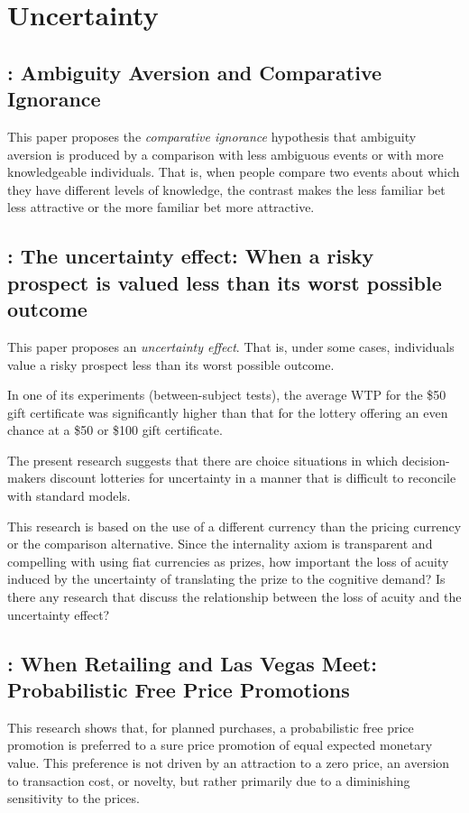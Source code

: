 \documentclass[11pt]{elegantbook}
\begin{document}
\chapter{Uncertainty}
\section{\cite{fox1995ambiguity}: Ambiguity Aversion and Comparative Ignorance}
This paper proposes the \textit{comparative ignorance} hypothesis that ambiguity aversion is produced by a comparison with less ambiguous events or with more knowledgeable individuals. That is, when people compare two events about which they have different levels of knowledge, the contrast makes the less familiar bet less attractive or the more familiar bet more attractive.


\section{\cite{gneezy2006uncertainty}: The uncertainty effect: When a risky prospect is valued less than its worst possible outcome}
This paper proposes an \textit{uncertainty effect}. That is, under some cases, individuals value a risky prospect less than its worst possible outcome.

In one of its experiments (between-subject tests), the average WTP for the \$50 gift certificate was significantly higher than that for the lottery offering an even chance at a \$50 or \$100 gift certificate.

The present research suggests that there are choice situations in which decision-makers discount lotteries for uncertainty in a manner that is difficult to reconcile with standard models.

This research is based on the use of a different currency than the pricing currency or the comparison alternative. Since the internality axiom is transparent and compelling with using fiat currencies as prizes, how important the loss of acuity induced by the uncertainty of translating the prize to the cognitive demand? Is there any research that discuss the relationship between the loss of acuity and the uncertainty effect?



\section{\cite{mazar2017retailing}: When Retailing and Las Vegas Meet: Probabilistic Free Price Promotions}
This research shows that, for planned purchases, a probabilistic free price promotion is preferred to a sure price promotion of equal expected monetary value.  This preference is not driven by an attraction to a zero price, an aversion to transaction cost, or novelty, but rather primarily due to a diminishing sensitivity to the prices.







\end{document}
